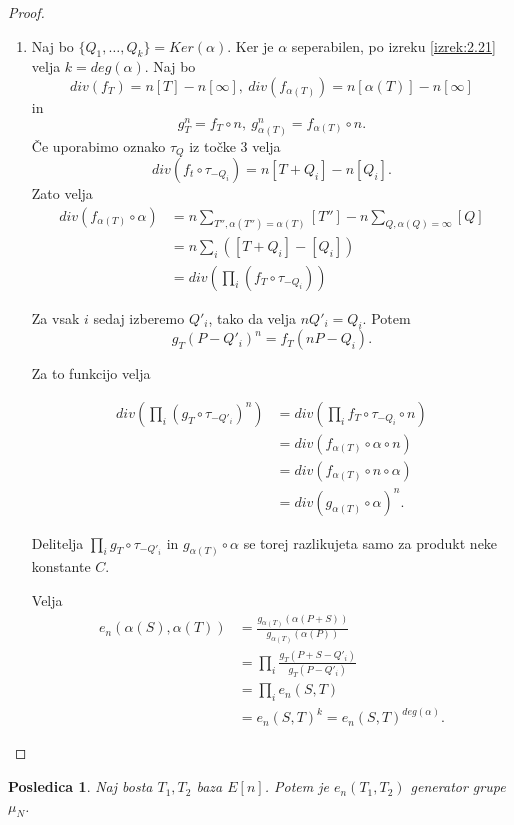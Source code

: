 \documentclass[12pt,a4paper,twoside]{article}
\theoremstyle{definition} %
\theoremstyle{plain} %
\newtheorem{posledica}[definicija]{Posledica}
\numberwithin{equation}{section}  %
\begin{document}
\begin{proof}
\begin{enumerate}
\item Naj bo $\{Q_1,\ldots,Q_k\} = Ker(\alpha)$. Ker je $\alpha$ seperabilen, po izreku \ref{izrek:2.21} velja $k = deg(\alpha)$.
Naj bo
$$div(f_T) = n[T]-n[\infty],\ div(f_{\alpha(T)}) = n[\alpha(T)]-n[\infty]$$
in
$$g^n_T = f_T \circ n, \ g^n_{\alpha(T)} = f_{\alpha(T)} \circ n.$$
Če uporabimo oznako $\tau_Q$ iz točke $3$ velja
$$div(f_t \circ \tau_{-Q_i}) = n[T+Q_i]-n[Q_i].$$
Zato velja
\begin{align}
div( f_{\alpha(T)} \circ \alpha) &{}= n \sum_{T'',\alpha(T'')=\alpha(T)}[T'']-n\sum_{Q,\alpha(Q)=\infty}[Q] \nonumber \\
&{} = n\sum_i ([T+Q_i]-[Q_i]) \nonumber \\
&{} = div(\prod_i(f_T \circ \tau_{-Q_i})) \nonumber
\end{align}

Za vsak $i$ sedaj izberemo $Q'_i$, tako da velja $nQ'_i = Q_i$. Potem
$$g_T(P-Q'_i)^n=f_T(nP-Q_i).$$

Za to funkcijo velja

\begin{align}
div(\prod_i(g_T \circ \tau_{-Q'_i})^n) &{} = div(\prod_i f_T \circ \tau_{-Q_i}\circ n) \nonumber \\
&{} = div(f_{\alpha(T)} \circ \alpha \circ n) \nonumber \\
&{} = div(f_{\alpha(T)} \circ n \circ \alpha) \nonumber \\
&{} = div(g_{\alpha(T)} \circ \alpha)^n. \nonumber
\end{align}

Delitelja $\prod_i g_T \circ \tau_{-Q'_i}$ in $g_{\alpha(T)} \circ \alpha$ se torej razlikujeta samo za produkt neke konstante $C$.

Velja
\begin{align}
e_n(\alpha(S),\alpha(T)) &{}= \frac{g_{\alpha(T)}(\alpha(P+S))}{g_{\alpha(T)}(\alpha(P))} \nonumber \\
&{} = \prod_i \frac{g_T(P+S-Q'_i)}{g_T(P-Q'_i)} \nonumber \\
&{} = \prod_i e_n(S,T) \nonumber  \\
&{} = e_n(S,T)^k = e_n(S,T)^{deg(\alpha)}. \nonumber
\end{align}

\end{enumerate}

\end{proof}


\begin{posledica}
\label{PosledicaTrdParj}
Naj bosta $T_1,T_2$ baza $E[n]$. Potem je $e_n(T_1,T_2)$ generator grupe $\mu_N$.
\end{posledica}
\end{document}
